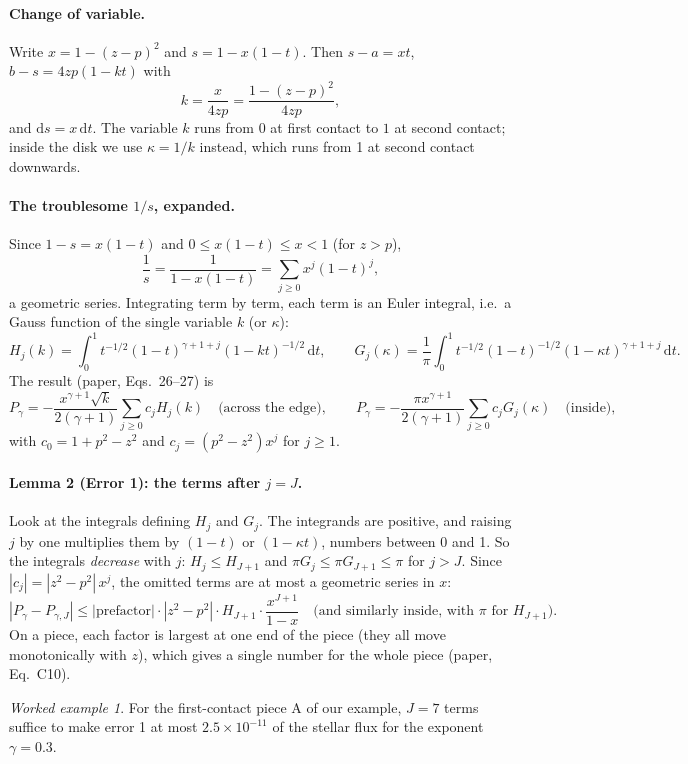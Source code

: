 \documentclass[11pt,a4paper]{article}
\theoremstyle{remark}
\newtheorem*{example}{Worked example}
\newcommand{\dd}{\mathrm{d}}
\begin{document}
\paragraph{Change of variable.} Write $x=1-(z-p)^2$ and $s=1-x(1-t)$. Then $s-a=xt$,
$b-s=4zp(1-kt)$ with
\[
  k=\frac{x}{4zp}=\frac{1-(z-p)^2}{4zp},
\]
and $\dd s=x\,\dd t$. The variable $k$ runs from $0$ at first contact to $1$ at second contact;
inside the disk we use $\kappa=1/k$ instead, which runs from 1 at second contact downwards.

\paragraph{The troublesome $1/s$, expanded.} Since $1-s=x(1-t)$ and $0\le x(1-t)\le x<1$ (for
$z>p$),
\[
  \frac1s=\frac{1}{1-x(1-t)}=\sum_{j\ge0}x^j(1-t)^j ,
\]
a geometric series. Integrating term by term, each term is an Euler integral, i.e.\ a Gauss
function of the single variable $k$ (or $\kappa$):
\[
  H_j(k)=\int_0^1t^{-1/2}(1-t)^{\gamma+1+j}(1-kt)^{-1/2}\,\dd t,\qquad
  G_j(\kappa)=\frac1\pi\int_0^1t^{-1/2}(1-t)^{-1/2}(1-\kappa t)^{\gamma+1+j}\,\dd t .
\]
The result (paper, Eqs.~26--27) is
\[
  P_\gamma=-\frac{x^{\gamma+1}\sqrt k}{2(\gamma+1)}\sum_{j\ge0}c_jH_j(k)\quad\text{(across the edge)},\qquad
  P_\gamma=-\frac{\pi x^{\gamma+1}}{2(\gamma+1)}\sum_{j\ge0}c_jG_j(\kappa)\quad\text{(inside)},
\]
with $c_0=1+p^2-z^2$ and $c_j=(p^2-z^2)x^j$ for $j\ge1$.

\paragraph{Lemma 2 (Error 1): the terms after $j=J$.} Look at the integrals defining $H_j$ and $G_j$.
The integrands are positive, and raising $j$ by one multiplies them by $(1-t)$ or $(1-\kappa t)$,
numbers between 0 and 1. So the integrals \emph{decrease} with $j$: $H_j\le H_{J+1}$ and
$\pi G_j\le\pi G_{J+1}\le\pi$ for $j>J$. Since $|c_j|=|z^2-p^2|\,x^j$, the omitted terms are at
most a geometric series in $x$:
\[
  |P_\gamma-P_{\gamma,J}|\le|\text{prefactor}|\cdot|z^2-p^2|\cdot H_{J+1}\cdot\frac{x^{J+1}}{1-x}
  \quad\text{(and similarly inside, with $\pi$ for $H_{J+1}$)}.
\]
On a piece, each factor is largest at one end of the piece (they all move monotonically with $z$),
which gives a single number for the whole piece (paper, Eq.~C10).

\begin{example}
For the first-contact piece A of our example, $J=7$ terms suffice to make error 1 at most
$2.5\times10^{-11}$ of the stellar flux for the exponent $\gamma=0.3$.
\end{example}
\end{document}
